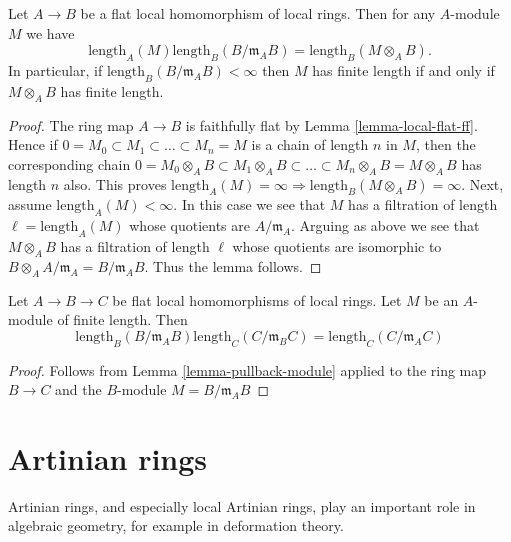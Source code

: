 \begin{lemma}
\label{lemma-pullback-module}
Let $A \to B$ be a flat local homomorphism of local rings.
Then for any $A$-module $M$ we have
$$
\text{length}_A(M) \text{length}_B(B/\mathfrak m_AB)
=
\text{length}_B(M \otimes_A B).
$$
In particular, if $\text{length}_B(B/\mathfrak m_AB) < \infty$
then $M$ has finite length if and only if $M \otimes_A B$ has finite length.
\end{lemma}

\begin{proof}
The ring map $A \to B$ is faithfully flat by
Lemma \ref{lemma-local-flat-ff}.
Hence if $0 = M_0 \subset M_1 \subset \ldots \subset M_n = M$
is a chain of length $n$ in $M$, then the corresponding chain
$0 = M_0 \otimes_A B \subset M_1 \otimes_A B \subset
\ldots \subset M_n \otimes_A B = M \otimes_A B$ has length $n$
also. This proves
$\text{length}_A(M) = \infty \Rightarrow
\text{length}_B(M \otimes_A B) = \infty$.
Next, assume $\text{length}_A(M) < \infty$. In this case we see
that $M$ has a filtration of length $\ell = \text{length}_A(M)$
whose quotients are $A/\mathfrak m_A$. Arguing as above
we see that $M \otimes_A B$ has a filtration of length $\ell$
whose quotients are isomorphic to
$B \otimes_A A/\mathfrak m_A =  B/\mathfrak m_AB$.
Thus the lemma follows.
\end{proof}

\begin{lemma}
\label{lemma-pullback-transitive}
Let $A \to B \to C$ be flat local homomorphisms of local rings.
Let $M$ be an $A$-module of finite length. Then
$$
\text{length}_B(B/\mathfrak m_A B)
\text{length}_C(C/\mathfrak m_B C)
=
\text{length}_C(C/\mathfrak m_A C)
$$
\end{lemma}

\begin{proof}
Follows from Lemma \ref{lemma-pullback-module} applied to the ring map
$B \to C$ and the $B$-module $M = B/\mathfrak m_A B$
\end{proof}











\section{Artinian rings}
\label{section-artinian}

\noindent
Artinian rings, and especially local Artinian rings,
play an important role in algebraic geometry, for example
in deformation theory.

